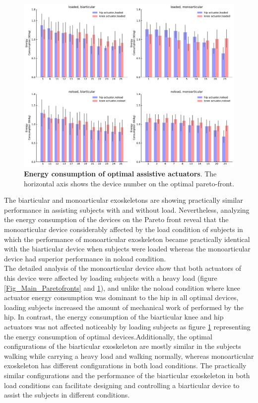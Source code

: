 \documentclass[10pt,letterpaper]{article}
\begin{document}
\begin{figure}[ht]   
	\centering
	\includegraphics[width=\linewidth]{Pareto_Simulations_Figures/PaperFigure_Paretofront_EnergyBarPlot.pdf}
	\vspace{1mm}
	\caption{{\small\textbf{Energy consumption of optimal assistive actuators}. The horizontal axis shows the device number on the optimal pareto-front.}}
	\label{Fig_Paretofronts_Actuators_EnergyBarPlot}
\end{figure}
The biarticular and monoarticular exoskeletons are showing practically similar performance in assisting subjects with and without load. Nevertheless, analyzing the energy consumption of the devices on the Pareto front reveal that the monoarticular device considerably affected by the load condition of subjects in which the performance of monoarticular exoskeleton became practically identical with the biarticular device when subjects were loaded whereas the monoarticular device had superior performance in noload condition.\\
The detailed analysis of the monoarticular device show that both actuators of this device were affected by loading subjects with a heavy load (figure \ref{Fig_Main_Paretofronts} and \ref{Fig_Paretofronts_Actuators_EnergyBarPlot}), and unlike the noload condition where knee actuator energy consumption was dominant to the hip in all optimal devices, loading subjects increased the amount of mechanical work of performed by the hip. In contrast, the energy consumption of the biarticular knee and hip actuators was not affected noticeably by loading subjects as figure \ref{Fig_Paretofronts_Actuators_EnergyBarPlot} representing the energy consumption of optimal devices.Additionally, the optimal configurations of the biarticular exoskeleton are mostly similar in the subjects walking while carrying a heavy load and walking normally, whereas monoarticular exoskeleton has different configurations in both load conditions. The practically similar configurations and the performance of the biarticular exoskeleton in both load conditions can facilitate designing and controlling a biarticular device to assist the subjects in different conditions.\\
\end{document}
